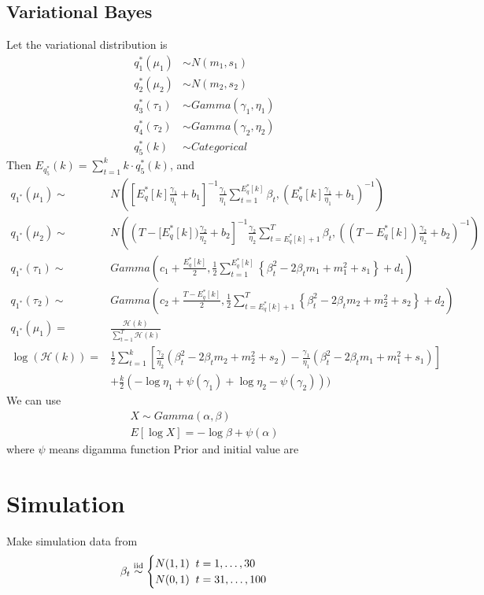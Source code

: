 \documentclass[11pt]{article}
\begin{document}
	\subsection{Variational Bayes}
	Let the variational distribution is
	\begin{align*}
		q_1^*(\mu_1) &\sim N(m_1,s_1)\\
		q_2^*(\mu_2) &\sim N(m_2,s_2)\\
		q_3^*(\tau_1) &\sim Gamma(\gamma_1,\eta_1)\\
		q_4^*(\tau_2) &\sim Gamma(\gamma_2,\eta_2)\\
		q_5^*(k) &\sim Categorical
	\end{align*}
		Then $E_{q_5^*}(k) = \sum_{t=1}^k k \cdot q_5^*(k)$, and 
	\begin{align*}
		q_{1^*}(\mu_1) \sim& N\left(\left[E_q^*[k] \frac{\gamma_1}{\eta_1}+b_1\right]^{-1}\frac{\gamma_1}{\eta_1}\sum_{t=1}^{E_q^*[k]}\beta_t ,\left(E_q^*[k]\frac{\gamma_1}{\eta_1}+b_1\right)^{-1}\right)\\
		q_{1^*}(\mu_2) \sim& N\left(\left  (T- [E_q^*[k]) \frac{\gamma_2}{\eta_2}+b_2\right]^{-1}\frac{\gamma_2}{\eta_2}\sum_{t=E_q^*[k]+1}^{T}\beta_t ,\left( (T-E_q^*[k])\frac{\gamma_2}{\eta_2}+b_2\right)^{-1}\right)\\
		q_{1^*}(\tau_1)  \sim& Gamma\left(c_1 + \frac{E_q^*[k]}{2}, \frac{1}{2} \sum_{t=1}^{E_q^*[k]} \left\{\beta_t^2 - 2\beta_t m_1 + m_1^2 + s_1 \right\} +d_1\right)\\
		q_{1^*}(\tau_2)  \sim& Gamma\left(c_2 + \frac{T - E_q^*[k]}{2}, \frac{1}{2} \sum_{t=E_q^*[k]+1}^{T} \left\{\beta_t^2 - 2\beta_t m_2 + m_2^2 + s_2 \right\} +d_2\right)\\
		q_{1^*}(\mu_1)  =& \frac{\mathcal{H}(k)}{\sum_{t=1}^T \mathcal{H}(k)}\\
		\log(\mathcal{H}(k))  =&\frac{1}{2} \sum_{t=1}^k \left[ \frac{\gamma_2}{\eta_2}(\beta_t^2 -2\beta_t m_2 + m_2^2 + s_2) - \frac{\gamma_1}{\eta_1}(\beta_t^2 -2\beta_t m_1 + m_1^2 + s_1)\right] \\ &+ \frac{k}{2} (-\log\eta_1 + \psi(\gamma_1) + \log\eta_2 - \psi(\gamma_2)))
	\end{align*}
	We can use
	\begin{align*}
	X \sim Gamma(\alpha,\beta)\\
	E[\log X] = -\log\beta +\psi(\alpha)
	\end{align*}
	where $\psi$ means digamma function
	Prior and initial value are
	
	\section{Simulation}
	Make simulation data from
	\begin{align*}
	\beta_t &\stackrel{\rm iid}{\sim} \begin{cases}
	N(1,1)\;\; t= 1, \dots ,30 \\
	N(0,1) \;\; t= 31, \dots ,100
	\end{cases}
	\end{align*}
\end{document}
